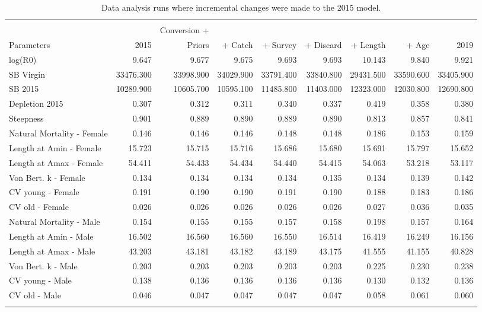 \documentclass[12pt,]{article}
\begin{document}
\begin{landscape}
\begingroup\fontsize{9pt}{10pt}\selectfont
\begin{longtable}{lrrrrrrrr}
\caption{Data analysis runs where incremental changes were made to the 2015 model.} \\ 
  \hline
 &  &  &  &  &  &  &  &  \\ 
             &       & Conversion + &         &           &           &           &       &      \\
 Parameters & 2015  & Priors       & + Catch & + Survey  & + Discard &  + Length & + Age & 2019 \\
 \hline
log(R0) & 9.647 & 9.677 & 9.675 & 9.693 & 9.693 & 10.143 & 9.840 & 9.921 \\ 
  SB Virgin & 33476.300 & 33998.900 & 34029.900 & 33791.400 & 33840.800 & 29431.500 & 33590.600 & 33405.900 \\ 
  SB 2015 & 10289.900 & 10605.700 & 10595.100 & 11485.800 & 11403.000 & 12323.000 & 12030.800 & 12690.800 \\ 
  Depletion 2015 & 0.307 & 0.312 & 0.311 & 0.340 & 0.337 & 0.419 & 0.358 & 0.380 \\ 
  Steepness & 0.901 & 0.889 & 0.890 & 0.889 & 0.890 & 0.813 & 0.857 & 0.841 \\ 
  Natural Mortality - Female & 0.146 & 0.146 & 0.146 & 0.148 & 0.148 & 0.186 & 0.153 & 0.159 \\ 
  Length at Amin - Female & 15.723 & 15.715 & 15.716 & 15.686 & 15.680 & 15.691 & 15.797 & 15.652 \\ 
  Length at Amax - Female & 54.411 & 54.433 & 54.434 & 54.440 & 54.415 & 54.063 & 53.218 & 53.117 \\ 
  Von Bert. k - Female & 0.134 & 0.134 & 0.134 & 0.134 & 0.135 & 0.134 & 0.139 & 0.142 \\ 
  CV young - Female & 0.191 & 0.190 & 0.190 & 0.191 & 0.190 & 0.188 & 0.183 & 0.186 \\ 
  CV old - Female & 0.026 & 0.026 & 0.026 & 0.026 & 0.026 & 0.027 & 0.036 & 0.035 \\ 
  Natural Mortality - Male & 0.154 & 0.155 & 0.155 & 0.157 & 0.158 & 0.198 & 0.157 & 0.164 \\ 
  Length at Amin - Male & 16.502 & 16.560 & 16.560 & 16.550 & 16.514 & 16.419 & 16.249 & 16.156 \\ 
  Length at Amax - Male & 43.203 & 43.181 & 43.182 & 43.189 & 43.175 & 41.555 & 41.155 & 40.828 \\ 
  Von Bert. k - Male & 0.203 & 0.203 & 0.203 & 0.203 & 0.203 & 0.225 & 0.230 & 0.238 \\ 
  CV young - Male & 0.138 & 0.136 & 0.136 & 0.136 & 0.136 & 0.130 & 0.132 & 0.136 \\ 
  CV old - Male & 0.046 & 0.047 & 0.047 & 0.047 & 0.047 & 0.058 & 0.061 & 0.060 \\ 
   \hline
\hline
\label{tab:bridge_table}
\end{longtable}
\endgroup
\end{landscape}
\end{document}
